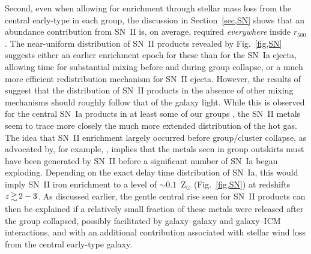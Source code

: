 \documentclass[useAMS,usenatbib]{mn2e}
\begin{document}
Second, even when allowing for enrichment through stellar mass loss
from the central early-type in each group, the discussion in
Section~\ref{sec,SN} shows that an abundance contribution from SN~II
is, on average, required {\em everywhere} inside $r_{500}$.  The
near-uniform distribution of SN~II products revealed by
Fig.~\ref{fig,SN} suggests either an earlier enrichment epoch for
these than for the SN~Ia ejecta, allowing time for substantial mixing
before and during group collapse, or a much more efficient
redistribution mechanism for SN~II ejecta. However, the results of
\citet*{ferr00a} suggest that the distribution of SN~II products in
the absence of other mixing mechanisms should roughly follow that of
the galaxy light. While this is observed for the central SN~Ia
products in at least some of our groups \citep{mend09}, the SN~II
metals seem to trace more closely the much more extended distribution
of the hot gas. The idea that SN~II enrichment largely occurred before
group/cluster collapse, as advocated by, for example, \citet{fino01},
implies that the metals seen in group outskirts must have been
generated by SN~II before a significant number of SN~Ia began
exploding. Depending on the exact delay time distribution of SN~Ia,
this would imply SN~II iron enrichment to a level of $\sim
0.1$~Z$_\odot$ (Fig.~\ref{fig,SN}) at redshifts $z\ga 2-3$. As
discussed earlier, the gentle central rise seen for SN~II products can
then be explained if a relatively small fraction of these metals were
released after the group collapsed, possibly facilitated by
galaxy--galaxy and galaxy--ICM interactions, and with an additional
contribution associated with stellar wind loss from the central
early-type galaxy.
\end{document}
